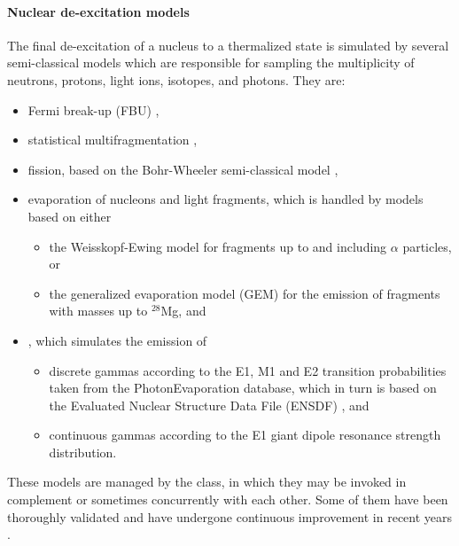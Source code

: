 \paragraph{Nuclear de-excitation models}
The final de-excitation of a nucleus to a thermalized state is simulated by
several semi-classical models which are responsible for sampling the 
multiplicity of neutrons, protons, light ions, isotopes, and photons.  They
are:
\begin{itemize}
\item Fermi break-up (FBU) \cite{hadbib:mfm-bondorf-1995},
\item statistical multifragmentation \cite{hadbib:mfm-bondorf-1995},
\item fission, based on the Bohr-Wheeler semi-classical model 
      \cite{hadbib:jinr-fis-1977, hadbib:inr-fis-1993},
\item evaporation of nucleons and light fragments, which is handled by models 
      based on either
\begin{itemize}
  \item the Weisskopf-Ewing model \cite{hadbib:weisskopf-1940} for fragments up
        to and including $\alpha$ particles, or
  \item the generalized evaporation model (GEM) \cite{hadbib:gem-2001} for the 
        emission of fragments with masses up to $^{28}$Mg, and 
\end{itemize}
\item {}, which simulates the emission of  
\begin{itemize}
\item discrete gammas according to the E1, M1 and E2 transition probabilities
      taken from the PhotonEvaporation database, which in turn is based on 
      the Evaluated Nuclear Structure Data File (ENSDF) \cite{hadbib:ENSDF}, 
      and 
\item continuous gammas according to the E1 giant dipole resonance strength 
      distribution.
\end{itemize}
\end{itemize}

These models are managed by the  class, in which
they may be invoked in complement or sometimes concurrently with each other.
Some of them have been thoroughly validated and have undergone continuous 
improvement in recent years \cite{hadbib:calor-2008, hadbib:pmb-fluka-g4-2011}.

